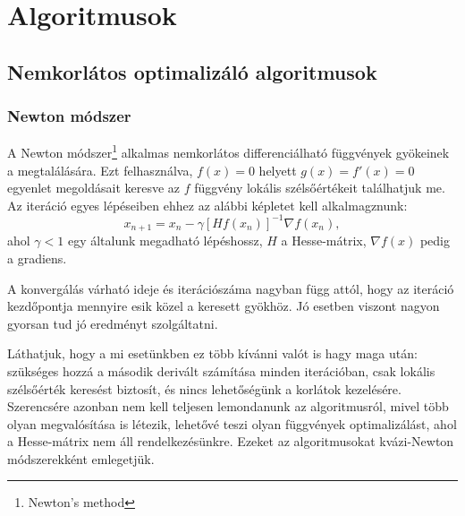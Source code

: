 \chapter{Algoritmusok}
\label{sec:algoritmusok}

\section{Nemkorlátos optimalizáló algoritmusok}

\subsection{Newton módszer}
A Newton módszer\footnote{Newton's method} alkalmas nemkorlátos differenciálható függvények gyökeinek a megtalálására. Ezt felhasználva, $f(x)=0$ helyett $g(x)=f'(x)=0$ egyenlet megoldásait keresve az $f$ függvény lokális szélsőértékeit találhatjuk me. Az iteráció egyes lépéseiben ehhez az alábbi képletet kell alkalmagznunk:
$$x_{n+1}=x_n-\gamma[Hf(x_n)]^{-1}\nabla f(x_n),$$ 
ahol $\gamma<1$ egy általunk megadható lépéshossz, $H$ a Hesse-mátrix, $\nabla f(x)$ pedig a gradiens.

A konvergálás várható ideje és iterációszáma nagyban függ attól, hogy az iteráció kezdőpontja mennyire esik közel a keresett gyökhöz. Jó esetben viszont nagyon gyorsan tud jó eredményt szolgáltatni.

Láthatjuk, hogy a mi esetünkben ez több kívánni valót is hagy maga után: szükséges hozzá a második derivált számítása minden iterációban, csak lokális szélsőérték keresést biztosít, és nincs lehetőségünk a korlátok kezelésére. Szerencsére azonban nem kell teljesen lemondanunk az algoritmusról, mivel több olyan megvalósítása is létezik, lehetővé teszi olyan függvények optimalizálást, ahol a Hesse-mátrix nem áll rendelkezésünkre. Ezeket az algoritmusokat kvázi-Newton módszerekként emlegetjük.

